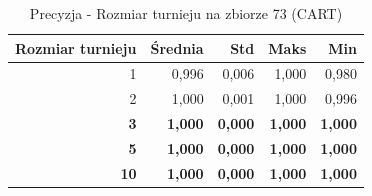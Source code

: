 \begin{table}[htbp]
\centering
\small
\setlength{\tabcolsep}{6pt}
\renewcommand{\arraystretch}{1.2}
\caption{Precyzja - Rozmiar turnieju na zbiorze 73 (CART)}
\label{tab:CART_tournament_size_73_precision}
\begin{tabular}{r|r|r|r|r}
\toprule
Rozmiar turnieju & Średnia & Std & Maks & Min \\
\hline
1 & 0,996 & 0,006 & 1,000 & 0,980 \\
2 & 1,000 & 0,001 & 1,000 & 0,996 \\
\textbf{3} & \textbf{1,000} & \textbf{0,000} & \textbf{1,000} & \textbf{1,000} \\
\textbf{5} & \textbf{1,000} & \textbf{0,000} & \textbf{1,000} & \textbf{1,000} \\
\textbf{10} & \textbf{1,000} & \textbf{0,000} & \textbf{1,000} & \textbf{1,000} \\
\bottomrule
\end{tabular}
\end{table}